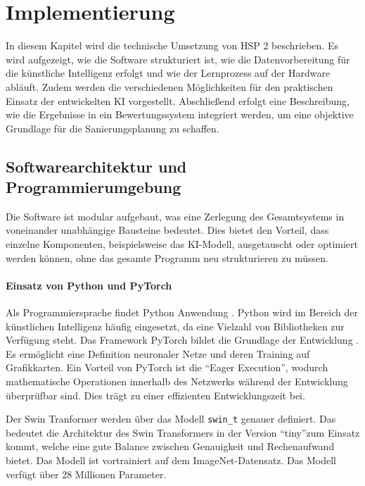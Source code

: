 \section{Implementierung}
\label{sec:implementierung}

In diesem Kapitel wird die technische Umsetzung von HSP 2 beschrieben. Es wird aufgezeigt, wie die Software strukturiert ist, wie die Datenvorbereitung für die künstliche Intelligenz erfolgt und wie der Lernprozess auf der Hardware abläuft. Zudem werden die verschiedenen Möglichkeiten für den praktischen Einsatz der entwickelten KI vorgestellt. Abschließend erfolgt eine Beschreibung, wie die Ergebnisse in ein Bewertungssystem integriert werden, um eine objektive Grundlage für die Sanierungsplanung zu schaffen.

\subsection{Softwarearchitektur und Programmierumgebung}
\label{subsec:softwarearchitektur}

Die Software ist modular aufgebaut, was eine Zerlegung des Gesamtsystems in voneinander unabhängige Bausteine bedeutet. Dies bietet den Vorteil, dass einzelne Komponenten, beispielsweise das KI-Modell, ausgetauscht oder optimiert werden können, ohne das gesamte Programm neu strukturieren zu müssen.

\paragraph{Einsatz von Python und PyTorch}
Als Programmiersprache findet Python Anwendung \cite{vanrossum2009python}. Python wird im Bereich der künstlichen Intelligenz häufig eingesetzt, da eine Vielzahl von Bibliotheken zur Verfügung steht.
Das Framework PyTorch bildet die Grundlage der Entwicklung \cite{paszke2019pytorch}. Es ermöglicht eine Definition neuronaler Netze und deren Training auf Grafikkarten. Ein Vorteil von PyTorch ist die "`Eager Execution"', wodurch mathematische Operationen innerhalb des Netzwerks während der Entwicklung überprüfbar sind. Dies trägt zu einer effizienten Entwicklungszeit bei.

Der Swin Tranformer werden über das Modell \texttt{swin\_t} genauer definiert. Das bedeutet die Architektur des Swin Transformers in der Version "`tiny"'zum Einsatz kommt, welche eine gute Balance zwischen Genauigkeit und Rechenaufwand bietet. Das Modell ist vortrainiert auf dem ImageNet-Datensatz. Das Modell verfügt über 28 Millionen Parameter.

